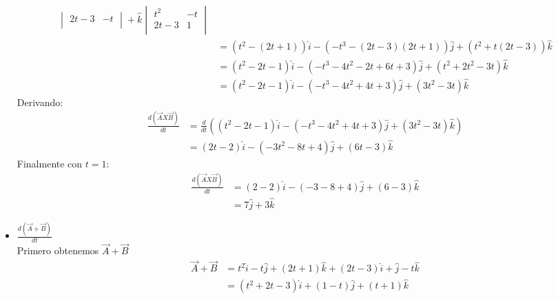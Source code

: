 \documentclass[12pt,openany]{book}
\begin{document}
\begin{itemize}
\begin{equation*}
\begin{split}
\begin{vmatrix}
				 	    										2t-3  &  -t 		\\
				 	    									\end{vmatrix}
				 	    						   +\hat{k}\begin{vmatrix}
				 	    										t^{2} & -t 			\\
				 	    										2t-3  &  1 			\\
				 	    									\end{vmatrix}			\\
				 	    					   &=\left(t^{2}-(2t+1)\right)\hat{i}-\left(-t^{3}-(2t-3)(2t+1)\right)\hat{j}
				 	    					   	 +\left(t^{2}+t(2t-3)\right)\hat{k}						\\
				 	    					   &=(t^{2}-2t-1)\hat{i}-(-t^{3}-4t^{2}-2t+6t+3)\hat{j}
				 	    					   	 +(t^{2}+2t^{2}-3t)\hat{k}								\\
				 	    					   &=(t^{2}-2t-1)\hat{i}-(-t^{3}-4t^{2}+4t+3)\hat{j}
				 	    					   	 +(3t^{2}-3t)\hat{k}
							\end{split}
						\end{equation*}
						Derivando:
						\begin{equation*}
							\begin{split}
								\frac{d(\vec{A}X\vec{B})}{dt}&=\frac{d}{dt}\left((t^{2}-2t-1)\hat{i}-(-t^{3}-4t^{2}+4t+3)\hat{j}
				 	    					   	 			  +(3t^{2}-3t)\hat{k}\right) 		\\
				 	    					   	 			 &=(2t-2)\hat{i}-(-3t^{2}-8t+4)\hat{j}+(6t-3)\hat{k}
							\end{split}
						\end{equation*}
						Finalmente con $t=1$:
						\begin{equation*}
							\begin{split}
								\frac{d(\vec{A}X\vec{B})}{dt}&=(2-2)\hat{i}-(-3-8+4)\hat{j}+(6-3)\hat{k}\\
															 &=7\hat{j}+3\hat{k}
							\end{split}
						\end{equation*}
					\item $\frac{d(\vec{A}+\vec{B})}{dt}$\\
						Primero obtenemos $\vec{A}+\vec{B}$
						\begin{equation*}
							\begin{split}
								\vec{A}+\vec{B}&=t^{2}\hat{i}-t\hat{j}+(2t+1)\hat{k}+(2t-3)\hat{i}+\hat{j}-t\hat{k} \\
												&=(t^{2}+2t-3)\hat{i}+(1-t)\hat{j}+(t+1)\hat{k}						\\

\end{split}
\end{equation*}
\end{itemize}
\end{document}
